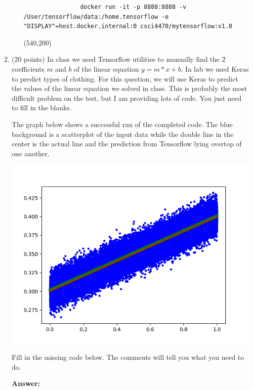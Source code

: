 \documentclass[10pt]{article}
\begin{document}
\begin{enumerate}
\begin{enumerate}
\beginanswers
			\begin{lstlisting}
				docker run -it -p 8888:8888 -v /User/tensorflow/data:/home.tensorflow -e "DISPLAY"=host.docker.internal:0 csci4470/mytensorflow:v1.0
			\end{lstlisting}
\else
\hspace*{-0.4in}\framebox(540,200){}
\fi

\end{enumerate}

\newpage

\item   (20 points) In class we used Tensorflow utilities to manually find the $2$ coefficients $m$ and $b$ of the 
	linear equation $y = m*x + b$. In lab we used Keras to predict types of clothing. For this question, we will use Keras to predict the values of the linear 
	equation we solved in class. This is probably the most difficult problem on the
	test, but I am providing lots of code. You just need to fill in the blanks.
	
	The graph below shows a successful run of the completed code. The blue background is a scatterplot of the input data while the double line in the center is the actual line and the prediction from Tensorflow lying overtop of one another.


\begin{center}
\includegraphics[width=0.6\linewidth]{images/linear.png}
\end{center}

Fill in the missing code below. The comments will tell you what you need to do.

\beginanswers

\textbf{Answer:}



\else




\end{enumerate}
\end{document}
